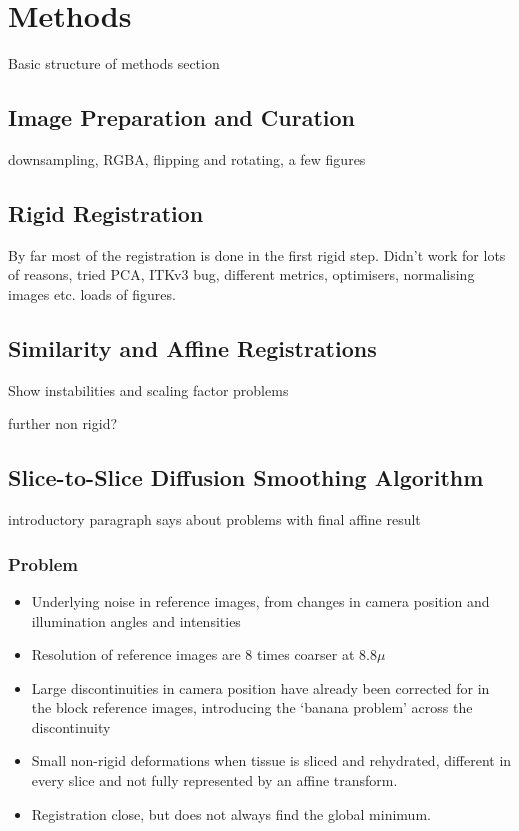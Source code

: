 \section{Methods} %
\label{sec:methods}
  Basic structure of methods section
  
  \subsection{Image Preparation and Curation} %
  \label{sub:image_preparation_and_curation}
    downsampling, RGBA, flipping and rotating, a few figures
  
  \subsection{Rigid Registration} %
  \label{sub:rigid_registration}
    By far most of the registration is done in the first rigid step. Didn't work for lots of reasons, tried PCA, ITKv3 bug, different metrics, optimisers, normalising images etc. loads of figures.
  
  \subsection{Similarity and Affine Registrations} %
  \label{sub:similarity_and_affine_registrations}
    Show instabilities and scaling factor problems
    
    further non rigid?
  
  \subsection{Slice-to-Slice Diffusion Smoothing Algorithm} %
  \label{sub:slice_to_slice_diffusion_smoothing_algorithm}
    introductory paragraph says about problems with final affine result
    \subsubsection{Problem}
      \begin{itemize}
        \item Underlying noise in reference images, from changes in camera position and illumination angles and intensities
        \item Resolution of reference images are 8 times coarser at 8.8$\mu$ 
        \item Large discontinuities in camera position have already been corrected for in the block reference images, introducing the `banana problem' across the discontinuity
        \item Small non-rigid deformations when tissue is sliced and rehydrated, different in every slice and not fully represented by an affine transform.
        \item Registration close, but does not always find the global minimum.
      \end{itemize}

